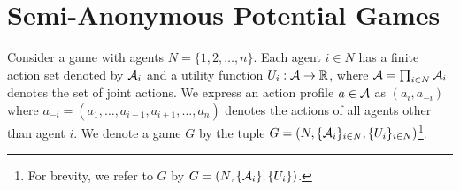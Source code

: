\section{Semi-Anonymous Potential Games}

Consider a game with agents $N = \{1,2,\ldots,n\}$. Each agent $i \in N$ has a finite action set denoted by ${\cal A}_i$ and a utility function $U_i : {\cal A} \rightarrow \mathbb{R}$, where ${\cal A} = \prod_{i \in N} {\cal A}_i$ denotes the set of joint actions.   We express an action profile $a \in {\cal A}$ as $(a_i,a_{-i})$ where $a_{-i} = (a_1,\ldots,a_{i-1},a_{i+1},\ldots, a_n)$ denotes the actions of all agents other than agent $i$.  We denote a game $G$ by the tuple $G = \left(N, \{{\cal A}_i\}_{i\in N}, \{U_i\}_{i \in N}\right)$\footnote{For brevity, we refer to $G$ by $G = \left(N, \{{\cal A}_i\}, \{U_i\}\right)$. }.  



